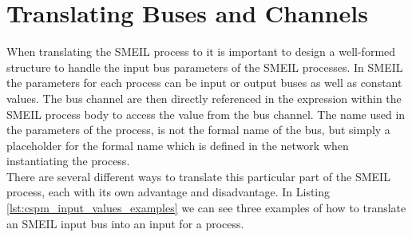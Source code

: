 \section{Translating Buses and Channels}
When translating the SMEIL process to \cspm{} it is important to design a well-formed structure to handle the input bus parameters of the SMEIL processes.
In SMEIL the parameters for each process can be input or output buses as well as constant values. The bus channel are then directly referenced in the expression within the SMEIL process body to access the value from the bus channel. The name used in the parameters of the process, is not the formal name of the bus, but simply a placeholder for the formal name which is defined in the network when instantiating the process. \\

There are several different ways to translate this particular part of the SMEIL process, each with its own advantage and disadvantage.
In Listing \ref{lst:cspm_input_values_examples} we can see three \cspm{} examples of how to translate an SMEIL input bus into an input for a \cspm{} process.\\

